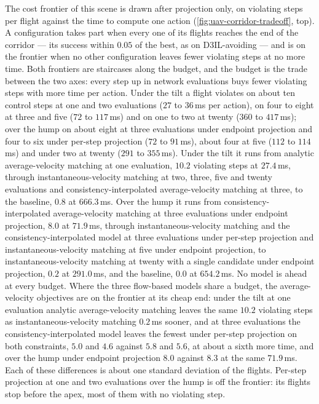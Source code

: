 The cost frontier of this scene is drawn after projection only, on violating steps per flight against the
time to compute one action (\autoref{fig:uav-corridor-tradeoff}, top). A configuration takes part when every one
of its flights reaches the end of the corridor --- its success within $0.05$ of the best, as on
D3IL-avoiding --- and is on the frontier when no other configuration leaves fewer violating steps at no more
time. Both frontiers are staircases along the budget, and the budget is the trade between the two axes:
every step up in network evaluations buys fewer violating steps with more time per action. Under the tilt a
flight violates on about ten control steps at one and two evaluations ($27$ to $36$\,ms per action), on four
to eight at three and five ($72$ to $117$\,ms) and on one to two at twenty ($360$ to $417$\,ms); over the hump
on about eight at three evaluations under endpoint projection and four to six under per-step projection
($72$ to $91$\,ms), about four at five ($112$ to $114$\,ms) and under two at twenty ($291$ to $355$\,ms). Under the tilt it runs from analytic average-velocity matching at one evaluation, $10.2$ violating
steps at $27.4$\,ms, through instantaneous-velocity matching at two, three, five and twenty evaluations and
consistency-interpolated average-velocity matching at three, to the baseline, $0.8$ at $666.3$\,ms. Over the
hump it runs from consistency-interpolated average-velocity matching at three evaluations under endpoint
projection, $8.0$ at $71.9$\,ms, through instantaneous-velocity matching and the consistency-interpolated
model at three evaluations under per-step projection and instantaneous-velocity matching at five under
endpoint projection, to instantaneous-velocity matching at twenty with a single candidate under endpoint
projection, $0.2$ at $291.0$\,ms, and the baseline, $0.0$ at $654.2$\,ms.
No model is ahead at every budget. Where the three flow-based models share a budget, the average-velocity
objectives are on the frontier at its cheap end: under the tilt at one evaluation analytic average-velocity
matching leaves the same $10.2$ violating steps as instantaneous-velocity matching $0.2$\,ms sooner, and at
three evaluations the consistency-interpolated model leaves the fewest under per-step projection on both
constraints, $5.0$ and $4.6$ against $5.8$ and $5.6$, at about a sixth more time, and over the hump under
endpoint projection $8.0$ against $8.3$ at the same $71.9$\,ms. Each of these differences is about one
standard deviation of the flights. Per-step projection at one and two evaluations over the hump is off the
frontier: its flights stop before the apex, most of them with no violating step.

